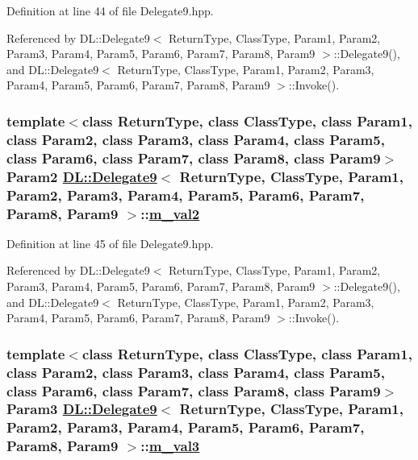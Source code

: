 Definition at line 44 of file Delegate9.hpp.

Referenced by DL::Delegate9$<$ Return\-Type, Class\-Type, Param1, Param2, Param3, Param4, Param5, Param6, Param7, Param8, Param9 $>$::Delegate9(), and DL::Delegate9$<$ Return\-Type, Class\-Type, Param1, Param2, Param3, Param4, Param5, Param6, Param7, Param8, Param9 $>$::Invoke().\hypertarget{classDL_1_1Delegate9_r3}{
\subsubsection[m\_\-val2]{\setlength{\rightskip}{0pt plus 5cm}template$<$class Return\-Type, class Class\-Type, class Param1, class Param2, class Param3, class Param4, class Param5, class Param6, class Param7, class Param8, class Param9$>$ Param2 \hyperlink{classDL_1_1Delegate9}{DL::Delegate9}$<$ Return\-Type, Class\-Type, Param1, Param2, Param3, Param4, Param5, Param6, Param7, Param8, Param9 $>$::\hyperlink{classDL_1_1Delegate9_r3}{m\_\-val2}}}
\label{classDL_1_1Delegate9_r3}




Definition at line 45 of file Delegate9.hpp.

Referenced by DL::Delegate9$<$ Return\-Type, Class\-Type, Param1, Param2, Param3, Param4, Param5, Param6, Param7, Param8, Param9 $>$::Delegate9(), and DL::Delegate9$<$ Return\-Type, Class\-Type, Param1, Param2, Param3, Param4, Param5, Param6, Param7, Param8, Param9 $>$::Invoke().\hypertarget{classDL_1_1Delegate9_r4}{
\subsubsection[m\_\-val3]{\setlength{\rightskip}{0pt plus 5cm}template$<$class Return\-Type, class Class\-Type, class Param1, class Param2, class Param3, class Param4, class Param5, class Param6, class Param7, class Param8, class Param9$>$ Param3 \hyperlink{classDL_1_1Delegate9}{DL::Delegate9}$<$ Return\-Type, Class\-Type, Param1, Param2, Param3, Param4, Param5, Param6, Param7, Param8, Param9 $>$::\hyperlink{classDL_1_1Delegate9_r4}{m\_\-val3}}}
\label{classDL_1_1Delegate9_r4}




